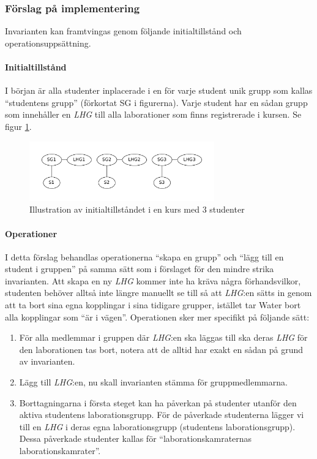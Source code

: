 \subsubsection{Förslag på implementering}
Invarianten kan  framtvingas genom följande initialtillstånd och operationsuppsättning.

\paragraph{Initialtillstånd}
I början är alla studenter inplacerade i en för varje student unik grupp som kallas “studentens grupp” (förkortat SG i figurerna). Varje student har en sådan grupp som innehåller en \emph{LHG} till alla laborationer som finns registrerade i kursen. Se figur \ref{fig:strict-initstate}.

\begin{figure}
  \centering
  \includegraphics[width=8.0cm]{fig/labgroup/strict_initstate.pdf}
  \caption{Illustration av initialtillståndet i en kurs med 3 studenter}\label{fig:strict-initstate}
\end{figure}

\paragraph{Operationer}
I detta förslag behandlas operationerna “skapa en grupp” och “lägg till en student i gruppen” på samma sätt som i förslaget för den mindre strika invarianten. Att skapa en ny \emph{LHG} kommer inte ha kräva några förhandsvilkor, studenten behöver alltså inte längre manuellt se till så att \emph{LHG}:en sätts in genom att ta bort sina egna kopplingar i sina tidigare grupper, istället tar Water bort alla kopplingar som “är i vägen”. Operationen sker mer specifikt på följande sätt:
\begin{enumerate}
  \item För alla medlemmar i gruppen där \emph{LHG}:en ska läggas till ska
    deras \emph{LHG} för den laborationen tas bort, notera att de alltid har
    exakt en sådan på grund av invarianten.
  \item Lägg till \emph{LHG}:en, nu skall invarianten stämma för gruppmedlemmarna.
  \item Borttagningarna i första steget kan ha påverkan på studenter utanför
  den aktiva studentens laborationsgrupp. För de påverkade studenterna lägger
  vi till en \emph{LHG} i  deras egna laborationsgrupp (studentens laborationsgrupp).
  Dessa påverkade studenter kallas för “laborationskamraternas
  laborationskamrater”.

\end{enumerate}

